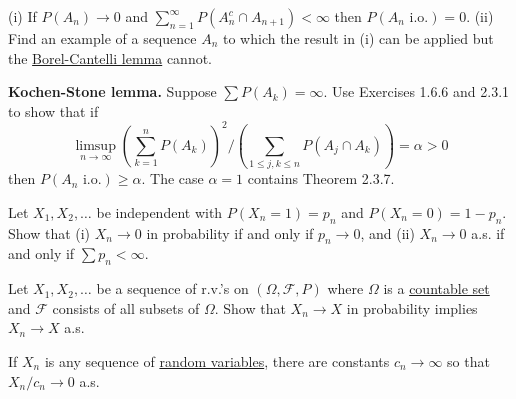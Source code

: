   \begin{exercise}[Durrett 2.3.9]
    (i) If $P(A_n) \to 0$ and $\sum_{n=1}^{\infty} P(A_n^c \cap A_{n+1}) < \infty$ then $P(A_n \text{ i.o.}) = 0$. (ii) Find an example of a sequence $A_n$ to which the result in (i) can be applied but the \hyperref[mt-thm:borel-cantelli-lemma]{Borel-Cantelli lemma} cannot.
  \end{exercise}
  \begin{solution}

  \end{solution}

  \begin{exercise}[Durrett 2.3.10]
    \textbf{Kochen-Stone lemma.} Suppose $\sum P(A_k) = \infty$. Use Exercises 1.6.6 and 2.3.1 to show that if
    \begin{equation*}
      \limsup_{n \to \infty} \left( \sum_{k=1}^n P(A_k) \right)^2 / \left( \sum_{1 \leq j, k \leq n} P(A_j \cap A_k) \right) = \alpha > 0
    \end{equation*}
    then $P(A_n \text{ i.o.}) \geq \alpha$. The case $\alpha = 1$ contains Theorem 2.3.7.
  \end{exercise}
  \begin{solution}

  \end{solution}

  \begin{exercise}[Durrett 2.3.11]
    Let $X_1, X_2, \dots$ be independent with $P(X_n = 1) = p_n$ and $P(X_n = 0) = 1 - p_n$. Show that (i) $X_n \to 0$ in probability if and only if $p_n \to 0$, and (ii) $X_n \to 0$ a.s. if and only if $\sum p_n < \infty$.
  \end{exercise}
  \begin{solution}

  \end{solution}

  \begin{exercise}[Durrett 2.3.12]
    Let $X_1, X_2, \dots$ be a sequence of r.v.'s on $(\Omega, \mathcal{F}, P)$ where $\Omega$ is a \hyperref[st-def:countable]{countable set} and $\mathcal{F}$ consists of all subsets of $\Omega$. Show that $X_n \to X$ in probability implies $X_n \to X$ a.s.
  \end{exercise}
  \begin{solution}

  \end{solution}

  \begin{exercise}[Durrett 2.3.13]
    If $X_n$ is any sequence of \hyperref[def:random-variable]{random variables}, there are constants $c_n \to \infty$ so that $X_n/c_n \to 0$ a.s.
  \end{exercise}
  \begin{solution}

  \end{solution}

